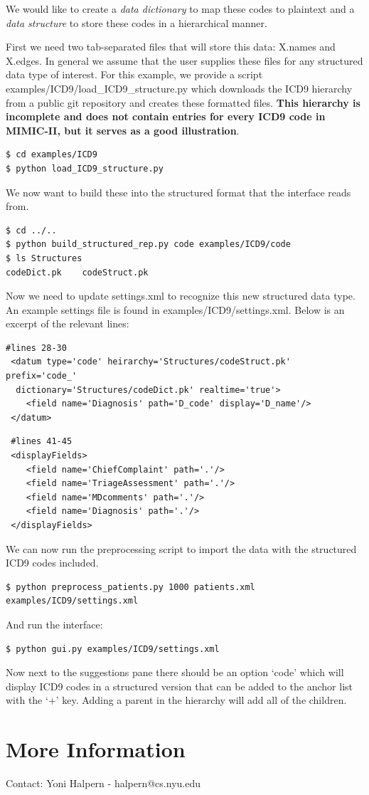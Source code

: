 \documentclass[12pt]{article}
\begin{document}
We would like to create a {\em data dictionary} to map these codes to plaintext and a {\em data structure} to store these codes in a hierarchical manner.

First we need two tab-separated files that will store this data: X.names and X.edges. 
In general we assume that the user supplies these files for any structured data type of interest.
For this example, we provide a script examples/ICD9/load\_ICD9\_structure.py which downloads the ICD9 hierarchy from a public git repository and creates these formatted files. {\bf This hierarchy is incomplete and does not contain entries for every ICD9 code in MIMIC-II, but it serves as a good illustration}.

\begin{verbatim}
$ cd examples/ICD9
$ python load_ICD9_structure.py
\end{verbatim}

We now want to build these into the structured format that the interface reads from.
\begin{verbatim}
$ cd ../..
$ python build_structured_rep.py code examples/ICD9/code
$ ls Structures
codeDict.pk    codeStruct.pk
\end{verbatim}

Now we need to update settings.xml to recognize this new structured data type. An example settings file is found in examples/ICD9/settings.xml. Below is an excerpt of the relevant lines:

\begin{verbatim}
#lines 28-30
 <datum type='code' heirarchy='Structures/codeStruct.pk' prefix='code_'
  dictionary='Structures/codeDict.pk' realtime='true'>
    <field name='Diagnosis' path='D_code' display='D_name'/>
 </datum>
 \end{verbatim}

 \begin{verbatim}
 #lines 41-45
 <displayFields>
    <field name='ChiefComplaint' path='.'/>
    <field name='TriageAssessment' path='.'/>
    <field name='MDcomments' path='.'/>
    <field name='Diagnosis' path='.'/>
 </displayFields>
\end{verbatim}

We can now run the preprocessing script to import the data with the structured ICD9 codes included.

\begin{verbatim}
$ python preprocess_patients.py 1000 patients.xml examples/ICD9/settings.xml
\end{verbatim}

And run the interface:
\begin{verbatim}
$ python gui.py examples/ICD9/settings.xml
\end{verbatim}

Now next to the suggestions pane there should be an option `code' which will display ICD9 codes in a structured version that can be added to the anchor list with the `+' key. Adding a parent in the hierarchy will add all of the children.

\section{More Information}
Contact: Yoni Halpern - halpern@cs.nyu.edu
\end{document}
